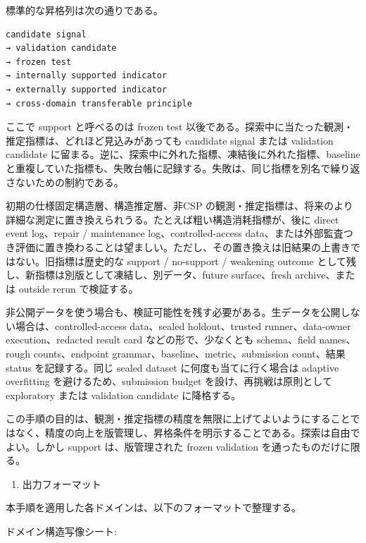 \documentclass[12pt,a4paper]{article}
\begin{document}
標準的な昇格列は次の通りである。

\begin{verbatim}
candidate signal
→ validation candidate
→ frozen test
→ internally supported indicator
→ externally supported indicator
→ cross-domain transferable principle
\end{verbatim}

ここで support と呼べるのは frozen test 以後である。探索中に当たった観測・推定指標は、どれほど見込みがあっても candidate signal または validation candidate に留まる。逆に、探索中に外れた指標、凍結後に外れた指標、baseline と重複していた指標も、失敗台帳に記録する。失敗は、同じ指標を別名で繰り返さないための制約である。

初期の仕様固定構造層、構造推定層、非CSP の観測・推定指標は、将来のより詳細な測定に置き換えられうる。たとえば粗い構造消耗指標が、後に direct event log、repair / maintenance log、controlled-access data、または外部監査つき評価に置き換わることは望ましい。ただし、その置き換えは旧結果の上書きではない。旧指標は歴史的な support / no-support / weakening outcome として残し、新指標は別版として凍結し、別データ、future surface、fresh archive、または outside rerun で検証する。

非公開データを使う場合も、検証可能性を残す必要がある。生データを公開しない場合は、controlled-access data、sealed holdout、trusted runner、data-owner execution、redacted result card などの形で、少なくとも schema、field names、rough counts、endpoint grammar、baseline、metric、submission count、結果 status を記録する。同じ sealed dataset に何度も当てに行く場合は adaptive overfitting を避けるため、submission budget を設け、再挑戦は原則として exploratory または validation candidate に降格する。

この手順の目的は、観測・推定指標の精度を無限に上げてよいようにすることではなく、精度の向上を版管理し、昇格条件を明示することである。探索は自由でよい。しかし support は、版管理された frozen validation を通ったものだけに限る。

\begin{enumerate}
\def\labelenumi{\arabic{enumi}.}
\setcounter{enumi}{5}
\tightlist
\item
  出力フォーマット
\end{enumerate}

本手順を適用した各ドメインは、以下のフォーマットで整理する。

ドメイン構造写像シート:
\end{document}
